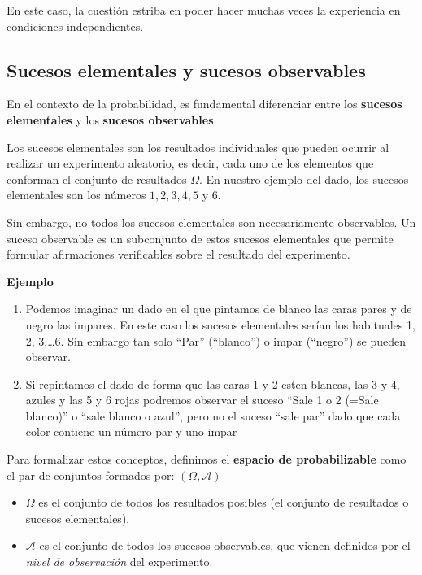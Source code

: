 \documentclass[
]{article}
\providecommand{\tightlist}{%
  \setlength{\itemsep}{0pt}\setlength{\parskip}{0pt}}
\begin{document}
En este caso, la cuestión estriba en poder hacer muchas veces la
experiencia en condiciones independientes.

\subsection{Sucesos elementales y sucesos observables}\label{sucesos-elementales-y-sucesos-observables}

En el contexto de la probabilidad, es fundamental diferenciar entre los \textbf{sucesos elementales} y los \textbf{sucesos observables}.

Los sucesos elementales son los resultados individuales que pueden ocurrir al realizar un experimento aleatorio, es decir, cada uno de los elementos que conforman el conjunto de resultados \(\Omega\). En nuestro ejemplo del dado, los sucesos elementales son los números \(1, 2, 3, 4, 5\) y \(6\).

Sin embargo, no todos los sucesos elementales son necesariamente observables. Un suceso observable es un subconjunto de estos sucesos elementales que permite formular afirmaciones verificables sobre el resultado del experimento.

\textbf{Ejemplo}

\begin{enumerate}
\def\labelenumi{\arabic{enumi}.}
\item
  Podemos imaginar un dado en el que pintamos de blanco las caras pares y de negro las impares. En este caso los sucesos elementales serían los habituales 1, 2, 3,\ldots6.
  Sin embargo tan solo ``Par'' (``blanco'') o impar (``negro'') se pueden observar.
\item
  Si repintamos el dado de forma que las caras 1 y 2 esten blancas, las 3 y 4, azules y las 5 y 6 rojas podremos observar el suceso ``Sale 1 o 2 (=Sale blanco)'' o ``sale blanco o azul'', pero no el suceso ``sale par'' dado que cada color contiene un número par y uno impar
\end{enumerate}

Para formalizar estos conceptos, definimos el \textbf{espacio de probabilizable} como el par de conjuntos formados por: \((\Omega, \mathcal{A})\)

\begin{itemize}
\tightlist
\item
  \(\Omega\) es el conjunto de todos los resultados posibles (el conjunto de resultados o sucesos elementales).
\item
  \(\mathcal{A}\) es el conjunto de todos los sucesos observables, que vienen definidos por el \emph{nivel de observación} del experimento.
\end{itemize}
\end{document}
